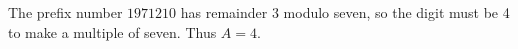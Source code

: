 The prefix number $1971210$ has remainder 3 modulo seven, so the digit must be 4 to make a multiple of seven. Thus $\boxed{A=4}$.
